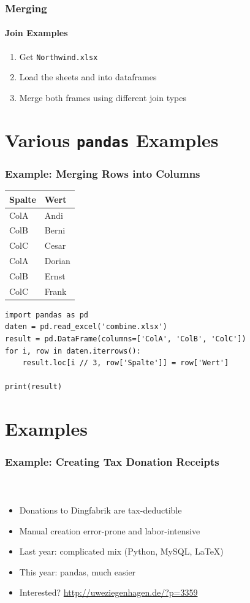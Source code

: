 \documentclass[12pt,ngerman]{beamer}
\begin{document}
\begin{frame}
\frametitle{Merging}
\framesubtitle{Join Examples}

\begin{infobox}[ backgroundcolor=blue!10,frametitle={Exercise}]
\begin{enumerate}
\item Get \texttt{Northwind.xlsx}
\item Load the sheets and into dataframes
\item Merge both frames using different join types
\end{enumerate}
\end{infobox}


\end{frame}


\section{Various \texttt{pandas} Examples}

\begin{frame}[fragile]
\frametitle{Example: Merging Rows into Columns}

{\footnotesize
\begin{tabular}{ll} \toprule
Spalte &  	Wert \\ \midrule
ColA 	& Andi \\
ColB 	& Berni \\
ColC 	& Cesar \\
ColA 	& Dorian \\
ColB 	& Ernst \\
ColC 	& Frank \\ \bottomrule
\end{tabular}} \vspace*{1em}

\begin{lstlisting}[morekeywords={loc,iterrows,read_excel}]
import pandas as pd
daten = pd.read_excel('combine.xlsx')
result = pd.DataFrame(columns=['ColA', 'ColB', 'ColC'])
for i, row in daten.iterrows():
    result.loc[i // 3, row['Spalte']] = row['Wert']

print(result)
\end{lstlisting}
\end{frame}



\section{Examples}

\begin{frame}
\frametitle{Example: Creating Tax Donation Receipts}
\framesubtitle{~}

\begin{itemize}
\item Donations to Dingfabrik are tax-deductible
\item Manual creation error-prone and labor-intensive
\item Last year: complicated mix (Python,  MySQL, \LaTeX)
\item This year: pandas, much easier
\item Interested? \url{http://uweziegenhagen.de/?p=3359}
\end{itemize}
\end{frame}
\end{document}
